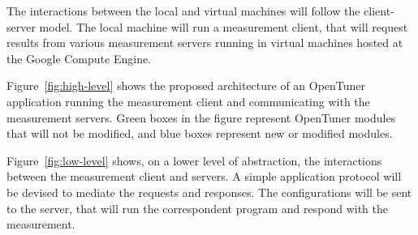 \documentclass[a4paper, 12pt]{article}
\begin{document}
The interactions between the local and virtual machines
will follow the client-server model. The local machine
will run a measurement client, that will request
results from various measurement servers running in
virtual machines hosted at the Google Compute Engine.

Figure~\ref{fig:high-level} shows the proposed architecture
of an OpenTuner application running the measurement
client and communicating with the measurement servers.
Green boxes in the figure represent OpenTuner modules
that will not be modified, and blue boxes represent
new or modified modules.

Figure~\ref{fig:low-level} shows, on a lower level
of abstraction, the interactions between the measurement
client and servers. A simple application protocol
will be devised to mediate the requests and responses.
The configurations will be sent to the server, that
will run the correspondent program and respond with
the measurement.
\end{document}
